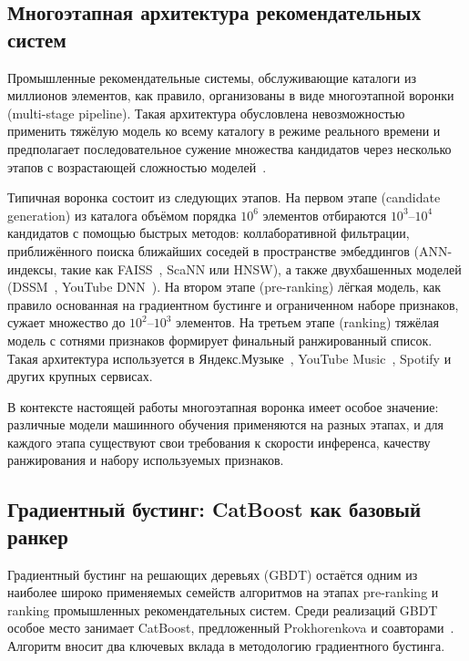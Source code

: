\subsection{Многоэтапная архитектура рекомендательных систем}

Промышленные рекомендательные системы, обслуживающие каталоги из миллионов элементов, как правило, организованы в виде многоэтапной воронки (multi-stage pipeline). Такая архитектура обусловлена невозможностью применить тяжёлую модель ко всему каталогу в режиме реального времени и предполагает последовательное сужение множества кандидатов через несколько этапов с возрастающей сложностью моделей~\cite{covington2016youtube}.

Типичная воронка состоит из следующих этапов. На первом этапе (candidate generation) из каталога объёмом порядка $10^6$ элементов отбираются $10^3$--$10^4$ кандидатов с помощью быстрых методов: коллаборативной фильтрации, приближённого поиска ближайших соседей в пространстве эмбеддингов (ANN-индексы, такие как FAISS~\cite{johnson2019faiss}, ScaNN или HNSW), а также двухбашенных моделей (DSSM~\cite{huang2013dssm}, YouTube DNN~\cite{covington2016youtube}). На втором этапе (pre-ranking) лёгкая модель, как правило основанная на градиентном бустинге и ограниченном наборе признаков, сужает множество до $10^2$--$10^3$ элементов. На третьем этапе (ranking) тяжёлая модель с сотнями признаков формирует финальный ранжированный список. Такая архитектура используется в Яндекс.Музыке~\cite{volokitin2023yandex}, YouTube Music~\cite{google2024transformers}, Spotify и других крупных сервисах.

В контексте настоящей работы многоэтапная воронка имеет особое значение: различные модели машинного обучения применяются на разных этапах, и для каждого этапа существуют свои требования к скорости инференса, качеству ранжирования и набору используемых признаков.

\subsection{Градиентный бустинг: CatBoost как базовый ранкер}

Градиентный бустинг на решающих деревьях (GBDT) остаётся одним из наиболее широко применяемых семейств алгоритмов на этапах pre-ranking и ranking промышленных рекомендательных систем. Среди реализаций GBDT особое место занимает CatBoost, предложенный Prokhorenkova и соавторами~\cite{prokhorenkova2018catboost}. Алгоритм вносит два ключевых вклада в методологию градиентного бустинга.


